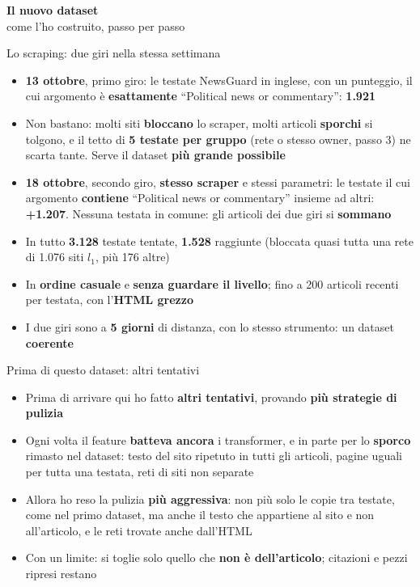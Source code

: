\documentclass[aspectratio=169]{beamer}
\newcommand{\hl}[1]{\textbf{#1}}
\newcommand{\divider}[2]{%
  \begin{frame}[plain]
    \vfill
    \begin{center}
      {\color{dividerblue}\Huge\textbf{#1}}\\[0.8em]
      {\large #2}
    \end{center}
    \vfill
  \end{frame}}
\begin{document}
\divider{Il nuovo dataset}{come l'ho costruito, passo per passo}

\begin{frame}{Lo scraping: due giri nella stessa settimana}
  \begin{itemize}[<+->]
    \setlength\itemsep{0.6em}
    \item \hl{13 ottobre}, primo giro: le testate NewsGuard in inglese, con un punteggio, il cui argomento \`e \hl{esattamente} ``Political news or commentary'': \hl{1.921}
    \item Non bastano: molti siti \hl{bloccano} lo scraper, molti articoli \hl{sporchi} si tolgono, e il tetto di \hl{5 testate per gruppo} (rete o stesso owner, passo 3) ne scarta tante. Serve il dataset \hl{pi\`u grande possibile}
    \item \hl{18 ottobre}, secondo giro, \hl{stesso scraper} e stessi parametri: le testate il cui argomento \hl{contiene} ``Political news or commentary'' insieme ad altri: \hl{+1.207}. Nessuna testata in comune: gli articoli dei due giri si \hl{sommano}
    \item In tutto \hl{3.128} testate tentate, \hl{1.528} raggiunte (bloccata quasi tutta una rete di 1.076 siti $l_1$, pi\`u 176 altre)
    \item In \hl{ordine casuale} e \hl{senza guardare il livello}; fino a 200 articoli recenti per testata, con l'\hl{HTML grezzo}
    \item I due giri sono a \hl{5 giorni} di distanza, con lo stesso strumento: un dataset \hl{coerente}
  \end{itemize}
\end{frame}

\begin{frame}{Prima di questo dataset: altri tentativi}
  \vfill
  \begin{itemize}[<+->]
    \setlength\itemsep{0.9em}
    \item Prima di arrivare qui ho fatto \hl{altri tentativi}, provando \hl{pi\`u strategie di pulizia}
    \item Ogni volta il feature \hl{batteva ancora} i transformer, e in parte per lo \hl{sporco} rimasto nel dataset: testo del sito ripetuto in tutti gli articoli, pagine uguali per tutta una testata, reti di siti non separate
    \item Allora ho reso la pulizia \hl{pi\`u aggressiva}: non pi\`u solo le copie tra testate, come nel primo dataset, ma anche il testo che appartiene al sito e non all'articolo, e le reti trovate anche dall'HTML
    \item Con un limite: si toglie solo quello che \hl{non \`e dell'articolo}; citazioni e pezzi ripresi restano
  \end{itemize}
  \vfill
\end{frame}
\end{document}
